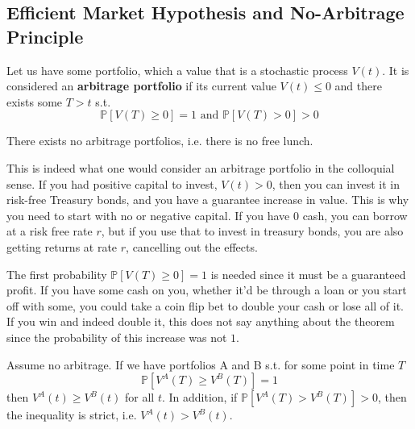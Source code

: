 \documentclass{article}
\begin{document}
  \subsection{Efficient Market Hypothesis and No-Arbitrage Principle}

    \begin{definition}
      Let us have some portfolio, which a value that is a stochastic process $V (t)$. It is considered an \textbf{arbitrage portfolio} if its current value $V(t) \leq 0$ and there exists some $T > t$ s.t. 
      \begin{equation}
        \mathbb{P}[V(T) \geq 0] = 1 \text{ and } \mathbb{P}[V(T) > 0] > 0
      \end{equation}
    \end{definition}

    \begin{theorem}
      There exists no arbitrage portfolios, i.e. there is no free lunch. 
    \end{theorem}

    This is indeed what one would consider an arbitrage portfolio in the colloquial sense. If you had positive capital to invest, $V(t) > 0$, then you can invest it in risk-free Treasury bonds, and you have a guarantee increase in value. This is why you need to start with no or negative capital. If you have $0$ cash, you can borrow at a risk free rate $r$, but if you use that to invest in treasury bonds, you are also getting returns at rate $r$, cancelling out the effects. 

    The first probability $\mathbb{P}[V(T) \geq 0] = 1$ is needed since it must be a guaranteed profit. If you have some cash on you, whether it'd be through a loan or you start off with some, you could take a coin flip bet to double your cash or lose all of it. If you win and indeed double it, this does not say anything about the theorem since the probability of this increase was not $1$. 

    \begin{theorem}
      Assume no arbitrage. If we have portfolios A and B s.t. for some point in time $T$ 
      \begin{equation}
        \mathbb{P}[V^A (T) \geq V^B (T)] = 1 
      \end{equation}
      then $V^A (t) \geq V^B (t)$ for all $t$. In addition, if $\mathbb{P}[V^A (T) > V^B (T)] > 0$, then the inequality is strict, i.e. $V^A (t) > V^B (t)$. 
    \end{theorem}
    
\end{document}
